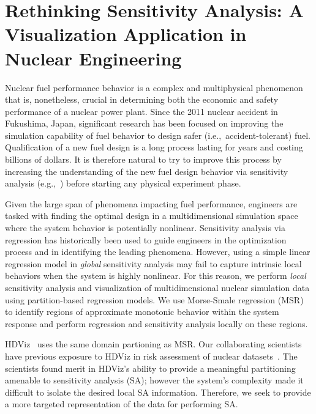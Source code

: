 
\chapter{Rethinking Sensitivity Analysis: A Visualization Application in\\Nuclear Engineering}
\label{ch:visualization}
Nuclear fuel performance behavior is a complex and multiphysical phenomenon that is, nonetheless, crucial in determining both the economic and safety performance of a nuclear power plant.
%
Since the 2011 nuclear accident in Fukushima, Japan, significant research has been focused on improving the simulation capability of fuel behavior to design safer (i.e.,\ accident-tolerant) fuel.
%
Qualification of a new fuel design is a long process lasting for years and costing billions of dollars.
%
It is therefore natural to try to improve this process by increasing the understanding of the new fuel design behavior via sensitivity analysis (e.g.,~\cite{IkonenTulkki2014,PastoreSwilerHales2015}) before starting any physical experiment phase.

Given the large span of phenomena impacting fuel performance, engineers are tasked with finding the optimal design in a multidimensional simulation space where the system behavior is potentially nonlinear.
%
Sensitivity analysis via regression has historically been used to guide engineers in the optimization process and in identifying the leading phenomena.
%
However, using a simple linear regression model in \emph{global} sensitivity analysis may fail to capture intrinsic local behaviors when the system is highly nonlinear.
%
For this reason, we perform \emph{local} sensitivity analysis and visualization of multidimensional nuclear simulation data using partition-based regression models.
%
We use Morse-Smale regression (MSR)~\cite{GerberRubelBremer2011} to identify regions of approximate monotonic behavior within the system response and perform regression and sensitivity analysis locally on these regions.

HDViz~\cite{GerberBremerPascucci2010} uses the same domain partioning as MSR.
%
Our collaborating scientists have previous exposure to HDViz in risk assessment of nuclear datasets~\cite{MaljovecWangMandelli2013a,MaljovecWangPascucci2013}.
%
The scientists found merit in HDViz's ability to provide a meaningful partitioning amenable to sensitivity analysis (SA); however the system's complexity made it difficult to isolate the desired local SA information.
%
Therefore, we seek to provide a more targeted representation of the data for performing SA.

